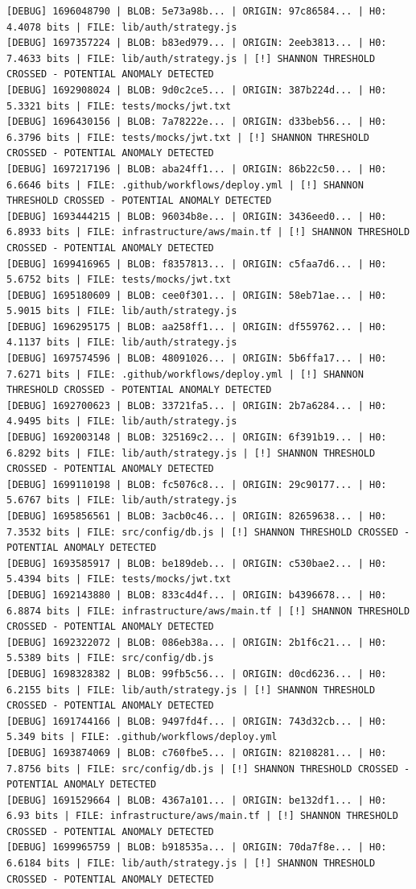 \documentclass[12pt, a4paper, oneside]{report}
\begin{document}
\begin{lstlisting}[basicstyle=\tiny\ttfamily]
[DEBUG] 1696048790 | BLOB: 5e73a98b... | ORIGIN: 97c86584... | H0: 4.4078 bits | FILE: lib/auth/strategy.js
[DEBUG] 1697357224 | BLOB: b83ed979... | ORIGIN: 2eeb3813... | H0: 7.4633 bits | FILE: lib/auth/strategy.js | [!] SHANNON THRESHOLD CROSSED - POTENTIAL ANOMALY DETECTED
[DEBUG] 1692908024 | BLOB: 9d0c2ce5... | ORIGIN: 387b224d... | H0: 5.3321 bits | FILE: tests/mocks/jwt.txt
[DEBUG] 1696430156 | BLOB: 7a78222e... | ORIGIN: d33beb56... | H0: 6.3796 bits | FILE: tests/mocks/jwt.txt | [!] SHANNON THRESHOLD CROSSED - POTENTIAL ANOMALY DETECTED
[DEBUG] 1697217196 | BLOB: aba24ff1... | ORIGIN: 86b22c50... | H0: 6.6646 bits | FILE: .github/workflows/deploy.yml | [!] SHANNON THRESHOLD CROSSED - POTENTIAL ANOMALY DETECTED
[DEBUG] 1693444215 | BLOB: 96034b8e... | ORIGIN: 3436eed0... | H0: 6.8933 bits | FILE: infrastructure/aws/main.tf | [!] SHANNON THRESHOLD CROSSED - POTENTIAL ANOMALY DETECTED
[DEBUG] 1699416965 | BLOB: f8357813... | ORIGIN: c5faa7d6... | H0: 5.6752 bits | FILE: tests/mocks/jwt.txt
[DEBUG] 1695180609 | BLOB: cee0f301... | ORIGIN: 58eb71ae... | H0: 5.9015 bits | FILE: lib/auth/strategy.js
[DEBUG] 1696295175 | BLOB: aa258ff1... | ORIGIN: df559762... | H0: 4.1137 bits | FILE: lib/auth/strategy.js
[DEBUG] 1697574596 | BLOB: 48091026... | ORIGIN: 5b6ffa17... | H0: 7.6271 bits | FILE: .github/workflows/deploy.yml | [!] SHANNON THRESHOLD CROSSED - POTENTIAL ANOMALY DETECTED
[DEBUG] 1692700623 | BLOB: 33721fa5... | ORIGIN: 2b7a6284... | H0: 4.9495 bits | FILE: lib/auth/strategy.js
[DEBUG] 1692003148 | BLOB: 325169c2... | ORIGIN: 6f391b19... | H0: 6.8292 bits | FILE: lib/auth/strategy.js | [!] SHANNON THRESHOLD CROSSED - POTENTIAL ANOMALY DETECTED
[DEBUG] 1699110198 | BLOB: fc5076c8... | ORIGIN: 29c90177... | H0: 5.6767 bits | FILE: lib/auth/strategy.js
[DEBUG] 1695856561 | BLOB: 3acb0c46... | ORIGIN: 82659638... | H0: 7.3532 bits | FILE: src/config/db.js | [!] SHANNON THRESHOLD CROSSED - POTENTIAL ANOMALY DETECTED
[DEBUG] 1693585917 | BLOB: be189deb... | ORIGIN: c530bae2... | H0: 5.4394 bits | FILE: tests/mocks/jwt.txt
[DEBUG] 1692143880 | BLOB: 833c4d4f... | ORIGIN: b4396678... | H0: 6.8874 bits | FILE: infrastructure/aws/main.tf | [!] SHANNON THRESHOLD CROSSED - POTENTIAL ANOMALY DETECTED
[DEBUG] 1692322072 | BLOB: 086eb38a... | ORIGIN: 2b1f6c21... | H0: 5.5389 bits | FILE: src/config/db.js
[DEBUG] 1698328382 | BLOB: 99fb5c56... | ORIGIN: d0cd6236... | H0: 6.2155 bits | FILE: lib/auth/strategy.js | [!] SHANNON THRESHOLD CROSSED - POTENTIAL ANOMALY DETECTED
[DEBUG] 1691744166 | BLOB: 9497fd4f... | ORIGIN: 743d32cb... | H0: 5.349 bits | FILE: .github/workflows/deploy.yml
[DEBUG] 1693874069 | BLOB: c760fbe5... | ORIGIN: 82108281... | H0: 7.8756 bits | FILE: src/config/db.js | [!] SHANNON THRESHOLD CROSSED - POTENTIAL ANOMALY DETECTED
[DEBUG] 1691529664 | BLOB: 4367a101... | ORIGIN: be132df1... | H0: 6.93 bits | FILE: infrastructure/aws/main.tf | [!] SHANNON THRESHOLD CROSSED - POTENTIAL ANOMALY DETECTED
[DEBUG] 1699965759 | BLOB: b918535a... | ORIGIN: 70da7f8e... | H0: 6.6184 bits | FILE: lib/auth/strategy.js | [!] SHANNON THRESHOLD CROSSED - POTENTIAL ANOMALY DETECTED
\end{lstlisting}
\end{document}
